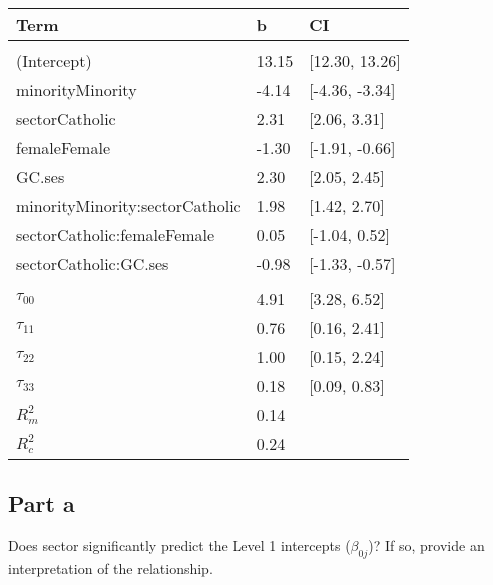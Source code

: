 \documentclass[]{article}
\begin{document}
\begin{table}[H]
\centering
\begin{tabular}{lll}
\toprule
Term & b & CI\\
\midrule
\addlinespace[0.3em]
\multicolumn{3}{l}{\textbf{Fixed}}\\
\hspace{1em}(Intercept) & 13.15 & [12.30, 13.26]\\
\hspace{1em}minorityMinority & -4.14 & [-4.36, -3.34]\\
\hspace{1em}sectorCatholic & 2.31 & [2.06, 3.31]\\
\hspace{1em}femaleFemale & -1.30 & [-1.91, -0.66]\\
\hspace{1em}GC.ses & 2.30 & [2.05, 2.45]\\
\hspace{1em}minorityMinority:sectorCatholic & 1.98 & [1.42, 2.70]\\
\hspace{1em}sectorCatholic:femaleFemale & 0.05 & [-1.04, 0.52]\\
\hspace{1em}sectorCatholic:GC.ses & -0.98 & [-1.33, -0.57]\\
\addlinespace[0.3em]
\multicolumn{3}{l}{\textbf{Random}}\\
\hspace{1em}$\tau_{00}$ & 4.91 & [3.28, 6.52]\\
\hspace{1em}$\tau_{11}$ & 0.76 & [0.16, 2.41]\\
\hspace{1em}$\tau_{22}$ & 1.00 & [0.15, 2.24]\\
\hspace{1em}$\tau_{33}$ & 0.18 & [0.09, 0.83]\\
$R^2_m$ & 0.14 & \\
$R^2_c$ & 0.24 & \\
\bottomrule
\end{tabular}
\end{table}

\subsection{Part a}\label{part-a-2}

Does sector significantly predict the Level 1 intercepts
(\(\beta_{0j}\))? If so, provide an interpretation of the relationship.
\end{document}
